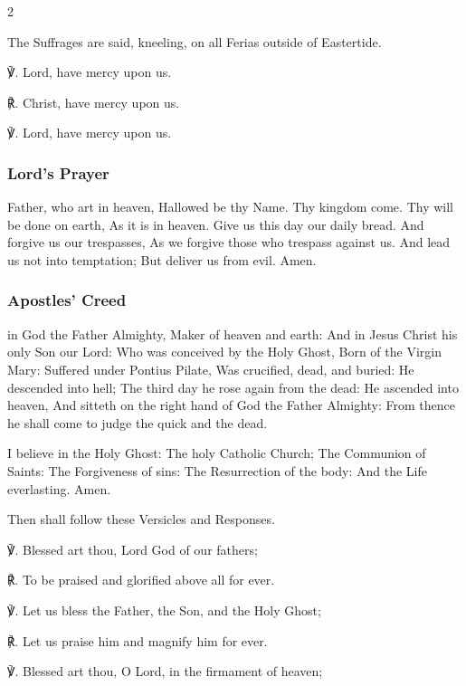 \begin{multicols}{2}
\begin{rubric}
	The Suffrages are said, kneeling, on all Ferias outside of Eastertide.
\end{rubric}
℣. Lord, have mercy upon us.

℟. Christ, have mercy upon us.

℣. Lord, have mercy upon us.

\subsubsection{Lord's Prayer}

 Father, who art in heaven, Hallowed be thy Name. Thy kingdom come. Thy will be done on earth, As it is in heaven. Give us this day our daily bread. And forgive us our trespasses, As we forgive those who trespass against us. And lead us not into temptation; But deliver us from evil. Amen.

\subsubsection{Apostles' Creed}

 in God the Father Almighty, Maker of heaven and earth:
    And in Jesus Christ his only Son our Lord: Who was conceived by the Holy Ghost, Born of the Virgin Mary: Suffered under Pontius Pilate, Was crucified, dead, and buried: He descended into hell; The third day he rose again from the dead: He ascended into heaven, And sitteth on the right hand of God the Father Almighty: From thence he shall come to judge the quick and the dead.\par
    I believe in the Holy Ghost: The holy Catholic Church; The Communion of Saints: The Forgiveness of sins: The Resurrection of the body: {} And the Life everlasting. Amen.

\begin{rubric}
	Then shall follow these Versicles and Responses.
\end{rubric}

℣. Blessed art thou, Lord God of our fathers;

℟. To be praised and glorified above all for ever.

℣. Let us bless the Father, the Son, and the Holy Ghost;

℟. Let us praise him and magnify him for ever.

℣. Blessed art thou, O Lord, in the firmament of heaven;


\end{multicols}

